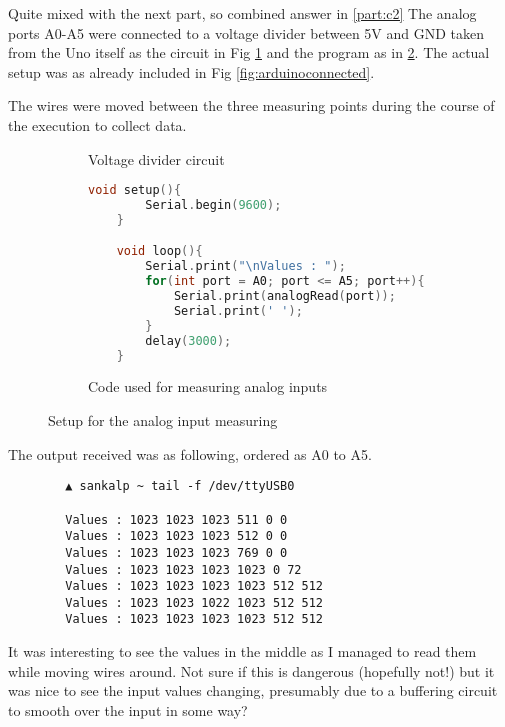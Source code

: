 \newpage


\begin{arabicparts}
    
    \questionpart
    Quite mixed with the next part, so combined answer in \ref{part:c2}
    \questionpart
    \label{part:c2}
    The analog ports A0-A5 were connected to a voltage divider between
    5V and GND taken from the Uno itself as the circuit in Fig \ref{subfig:voltdiv}
    and the program as in \ref{subfig:analogcode}. The actual setup was as already
    included in Fig \ref{fig:arduinoconnected}.

    The wires were moved between the three measuring points during the course 
    of the execution to collect data.

    \begin{figure}[ht]
        \centering
        \begin{subfigure}[b]{0.7\textwidth}
            \def\svgwidth{0.5\textwidth}
            \scalebox{1.1}{}
            \caption{Voltage divider circuit}
            \label{subfig:voltdiv}
        \end{subfigure}
        \begin{subfigure}[b]{0.7\textwidth}
            \begin{lstlisting}[language=C++]
    void setup(){
        Serial.begin(9600);
    }

    void loop(){
        Serial.print("\nValues : ");
        for(int port = A0; port <= A5; port++){
            Serial.print(analogRead(port));
            Serial.print(' ');
        }
        delay(3000);
    }
            \end{lstlisting}
            \caption{Code used for measuring analog inputs}
            \label{subfig:analogcode}
        \end{subfigure}
        \caption{Setup for the analog input measuring}
        \label{fig:analogsetup}
    \end{figure}

    The output received was as following, ordered as A0 to A5.

    \begin{verbatim}
        ▲ sankalp ~ tail -f /dev/ttyUSB0

        Values : 1023 1023 1023 511 0 0 
        Values : 1023 1023 1023 512 0 0 
        Values : 1023 1023 1023 769 0 0 
        Values : 1023 1023 1023 1023 0 72 
        Values : 1023 1023 1023 1023 512 512 
        Values : 1023 1023 1022 1023 512 512 
        Values : 1023 1023 1023 1023 512 512       
    \end{verbatim}

    It was interesting to see the values in the middle as I managed to read them
    while moving wires around. Not sure if this is dangerous (hopefully not!) but
    it was nice to see the input values changing, presumably due to a buffering
    circuit to smooth over the input in some way?
    
\end{arabicparts}

